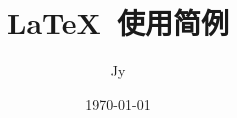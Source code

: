 \documentclass{article}
\begin{document}
\title{\LaTeX\ 使用简例}
\author{Jy}
\date{\today}

\maketitle %






\end{document}
